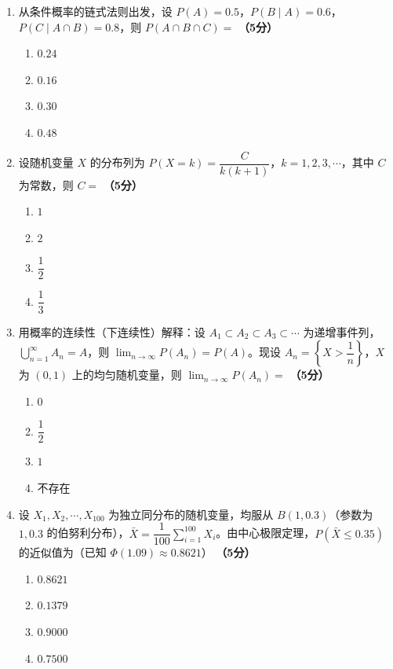 \documentclass[12pt, a4paper]{ctexart}
\newcommand{\score}[1]{\hfill\textbf{（#1分）}}
\begin{document}
\begin{enumerate}
\item 从条件概率的链式法则出发，设 $P(A)=0.5$，$P(B\mid A)=0.6$，$P(C\mid A\cap B)=0.8$，则 $P(A\cap B\cap C)=$ \score{5}
\begin{enumerate}[label=\Alph*.]
    \item $0.24$
    \item $0.16$
    \item $0.30$
    \item $0.48$
\end{enumerate}

\item 设随机变量 $X$ 的分布列为 $P(X=k)=\dfrac{C}{k(k+1)}$，$k=1,2,3,\cdots$，其中 $C$ 为常数，则 $C=$ \score{5}
\begin{enumerate}[label=\Alph*.]
    \item $1$
    \item $2$
    \item $\dfrac{1}{2}$
    \item $\dfrac{1}{3}$
\end{enumerate}

\item 用概率的连续性（下连续性）解释：设 $A_1\subset A_2\subset A_3\subset\cdots$ 为递增事件列，$\displaystyle\bigcup_{n=1}^{\infty}A_n=A$，则 $\displaystyle\lim_{n\to\infty}P(A_n)=P(A)$。现设 $A_n=\left\{X>\dfrac{1}{n}\right\}$，$X$ 为 $(0,1)$ 上的均匀随机变量，则 $\displaystyle\lim_{n\to\infty}P(A_n)=$ \score{5}
\begin{enumerate}[label=\Alph*.]
    \item $0$
    \item $\dfrac{1}{2}$
    \item $1$
    \item 不存在
\end{enumerate}

\item 设 $X_1,X_2,\cdots,X_{100}$ 为独立同分布的随机变量，均服从 $B(1,0.3)$（参数为 $1,0.3$ 的伯努利分布），$\bar{X}=\dfrac{1}{100}\displaystyle\sum_{i=1}^{100}X_i$。由中心极限定理，$P(\bar{X}\leq 0.35)$ 的近似值为（已知 $\Phi(1.09)\approx 0.8621$） \score{5}
\begin{enumerate}[label=\Alph*.]
    \item $0.8621$
    \item $0.1379$
    \item $0.9000$
    \item $0.7500$
\end{enumerate}

\end{enumerate}
\end{document}
